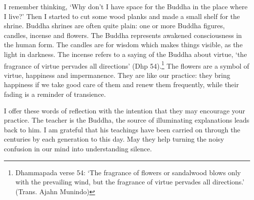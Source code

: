 I remember thinking, `Why don't I have space for the Buddha in the place
where I live?' Then I started to cut some wood planks and made a small
shelf for the shrine. Buddha shrines are often quite plain: one or more
Buddha figures, candles, incense and flowers. The Buddha represents
awakened consciousness in the human form. The candles are for wisdom
which makes things visible, as the light in darkness. The incense refers
to a saying of the Buddha about virtue, `the fragrance of virtue
pervades all directions' (Dhp 54).\footnote{Dhammapada verse 54: `The
  fragrance of flowers or sandalwood blows only with the prevailing
  wind, but the fragrance of virtue pervades all directions.' (Trans.
  Ajahn Munindo)} The flowers are a symbol of virtue, happiness and
impermanence. They are like our practice: they bring happiness if we
take good care of them and renew them frequently, while their fading is
a reminder of transience.

I offer these words of reflection with the intention that they may
encourage your practice. The teacher is the Buddha, the source of
illuminating explanations leads back to him. I am grateful that his
teachings have been carried on through the centuries by each generation
to this day. May they help turning the noisy confusion in our mind into
understanding silence.
